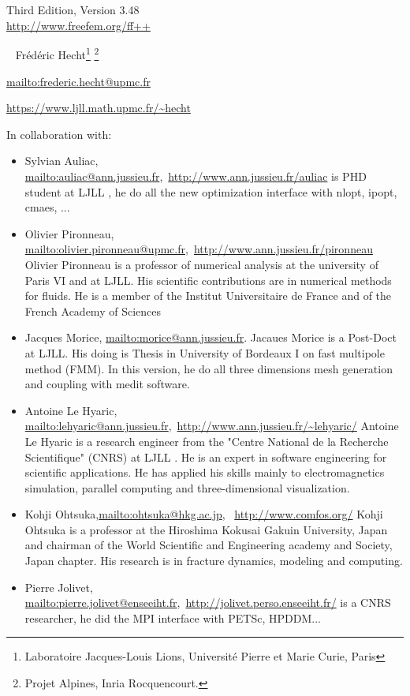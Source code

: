 \documentclass[a4paper,twoside,12pt]{book}
\def\VERSION{3.48}
\begin{document}
\begin{center}
 {} \\ \vglue 0.0cm  ~ \\
   Third Edition, Version \VERSION
 \\ \vglue 0.7cm
 {\Large \url{http://www.freefem.org/ff++}} \\
\vglue 0.5cm

 \
{ Fr\'{e}d\'{e}ric Hecht\footnote{Laboratoire Jacques-Louis Lions, Universit\'{e} Pierre et Marie Curie, Paris}
\footnote{Projet Alpines, Inria Rocquencourt.} }

\url{mailto:frederic.hecht@upmc.fr}

\url{https://www.ljll.math.upmc.fr/~hecht}


\bigskip

In collaboration with:
{\small
\begin{itemize}
\item {\normalsize Sylvian Auliac}, \url{mailto:auliac@ann.jussieu.fr},~\url{http://www.ann.jussieu.fr/auliac}
{is PHD student at LJLL  , he do all the new optimization interface with nlopt, ipopt, cmaes, ...}

\item {\normalsize Olivier Pironneau}, \url{mailto:olivier.pironneau@upmc.fr},~\url{http://www.ann.jussieu.fr/pironneau}
{Olivier Pironneau is a professor of numerical analysis at the university of Paris VI and at LJLL.  His scientific contributions are in numerical methods for fluids.  He is a member of the Institut Universitaire de France and of the French  Academy of Sciences}
\item {\normalsize Jacques Morice}, \url{mailto:morice@ann.jussieu.fr}.
Jacaues Morice is a Post-Doct at LJLL. His doing is Thesis in University of Bordeaux I on fast multipole method (FMM).
In this version, he do all three dimensions mesh generation and coupling with medit software.
\item {\normalsize Antoine Le Hyaric}, \url{mailto:lehyaric@ann.jussieu.fr},~\url{http://www.ann.jussieu.fr/~lehyaric/}
{Antoine Le Hyaric}{ is a research engineer  from the "Centre National de la
Recherche Scientifique" (CNRS) at LJLL . He is an expert in software engineering
for scientific applications. He has applied his skills mainly to
electromagnetics simulation, parallel computing and three-dimensional
visualization.}
\item {\normalsize Kohji Ohtsuka},\url{mailto:ohtsuka@hkg.ac.jp},~ \url{http://www.comfos.org/}
{Kohji Ohtsuka}{ is a professor at the Hiroshima Kokusai Gakuin University, Japan and chairman of the World Scientific and Engineering academy and Society, Japan chapter.  His research is in fracture dynamics, modeling and computing.}
\item {\normalsize Pierre  Jolivet}, \url{mailto:pierre.jolivet@enseeiht.fr},~\url{http://jolivet.perso.enseeiht.fr/}
{is a CNRS researcher, he did the MPI interface with PETSc, HPDDM...}

\end{itemize}}
\end{center}
\end{document}
